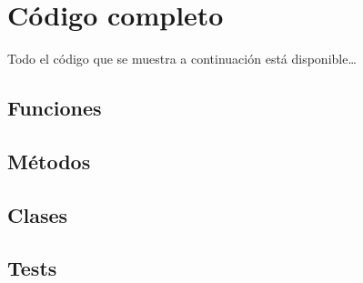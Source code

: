 \chapter{Código completo}

Todo el código que se muestra a continuación está disponible\ldots{}

\section{Funciones}
\label{sec:org8139aeb}
\section{Métodos}
\label{sec:orgbe8fea0}
\section{Clases}
\label{sec:orgb0b93d1}
\section{Tests}
\label{sec:orgcf2a5a7}

